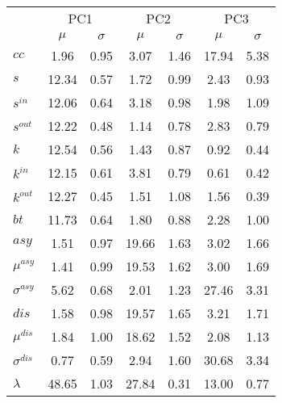 \begin{center}
\begin{tabular}{| l || c | c | c | c | c | c |}\cline{2-7}
\multicolumn{1}{c|}{} & \multicolumn{2}{c|}{PC1}          & \multicolumn{2}{c|}{PC2} & \multicolumn{2}{c|}{PC3}  \\\cline{2-7}\multicolumn{1}{c|}{} & $\mu$            & $\sigma$ & $\mu$         & $\sigma$ & $\mu$ & $\sigma$  \\\hline
$cc$ & 1.96  & 0.95  & 3.07  & 1.46  & 17.94  & 5.38 \\\hline
$s$ & 12.34  & 0.57  & 1.72  & 0.99  & 2.43  & 0.93 \\
$s^{in}$ & 12.06  & 0.64  & 3.18  & 0.98  & 1.98  & 1.09 \\
$s^{out}$ & 12.22  & 0.48  & 1.14  & 0.78  & 2.83  & 0.79 \\
$k$ & 12.54  & 0.56  & 1.43  & 0.87  & 0.92  & 0.44 \\
$k^{in}$ & 12.15  & 0.61  & 3.81  & 0.79  & 0.61  & 0.42 \\
$k^{out}$ & 12.27  & 0.45  & 1.51  & 1.08  & 1.56  & 0.39 \\
$bt$ & 11.73  & 0.64  & 1.80  & 0.88  & 2.28  & 1.00 \\\hline
$asy$ & 1.51  & 0.97  & 19.66  & 1.63  & 3.02  & 1.66 \\
$\mu^{asy}$ & 1.41  & 0.99  & 19.53  & 1.62  & 3.00  & 1.69 \\
$\sigma^{asy}$ & 5.62  & 0.68  & 2.01  & 1.23  & 27.46  & 3.31 \\
$dis$ & 1.58  & 0.98  & 19.57  & 1.65  & 3.21  & 1.71 \\
$\mu^{dis}$ & 1.84  & 1.00  & 18.62  & 1.52  & 2.08  & 1.13 \\
$\sigma^{dis}$ & 0.77  & 0.59  & 2.94  & 1.60  & 30.68  & 3.34 \\\hline\hline
$\lambda$ & 48.65  & 1.03  & 27.84  & 0.31  & 13.00  & 0.77 \\
\hline\end{tabular}
\end{center}
